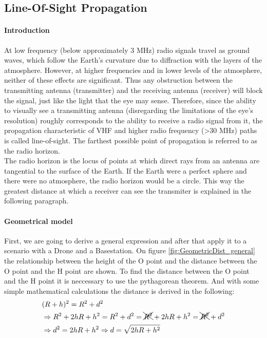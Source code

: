 \subsection*{Line-Of-Sight Propagation}
\paragraph{Introduction}
At low frequency (below approximately 3 MHz) radio signals travel as ground waves, which follow the Earth's curvature due to diffraction with the layers of the atmosphere.
However, at higher frequencies and in lower levels of the atmosphere, neither of these effects are significant. Thus any obstruction between the transmitting antenna (transmitter) and the receiving antenna (receiver) will block the signal, just like the light that the eye may sense. Therefore, since the ability to visually see a transmitting antenna (disregarding the limitations of the eye's resolution) roughly corresponds to the ability to receive a radio signal from it, the propagation characteristic of VHF and higher radio frequency (>30 MHz) paths is called line-of-sight. The farthest possible point of propagation is referred to as the radio horizon.\\

The radio horizon is the locus of points at which direct rays from an antenna are tangential to the surface of the Earth. If the Earth were a perfect sphere and there were no atmosphere, the radio horizon would be a circle.
This way the greatest distance at which a receiver can see the transmiter is explained in the following paragraph.

\paragraph{Geometrical model}

First, we are going to derive a general expression and after that apply it to a scenario with a Drone and a Basestation. On figure  \ref{fig:GeometricDist_general} the relationship between the height of the O point and the distance between the O point and the H point are shown. To find the distance between the O point and the H point it is neccessary to use the pythagorean theorem. And with some simple mathematical calculations the distance is derived in the following:
\begin{align}
&(R+h)^2 = R^2+d^2\nonumber \\
&\Rightarrow R^2+2hR+h^2 = R^2+d^2 = \xcancel{R^2}+2hR+h^2 = \xcancel{R^2}+d^2\nonumber \\
&\Rightarrow d^2 = 2hR + h^2 \Rightarrow d = \sqrt{2hR + h^2} \label{eq:los_distToHorizon}
\end{align}

